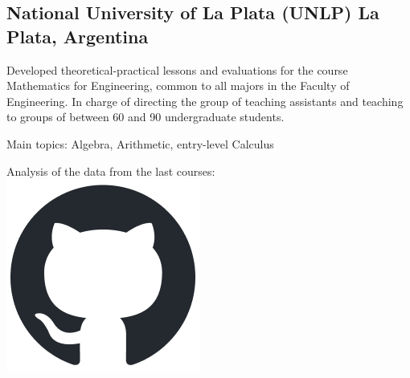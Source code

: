 
\subsection{{National University of La Plata (UNLP) \hfill  La Plata, Argentina}}
\begin{zitemize}
\item Developed theoretical-practical lessons and evaluations for the course Mathematics for Engineering, common to all majors in the Faculty of Engineering. In charge of directing the group of teaching assistants and teaching to groups of between 60 and 90 undergraduate students.
\item Main topics: Algebra, Arithmetic, entry-level Calculus
\item Analysis of the data from the last courses: \href{https://github.com/juanjogervasio/Intro-courses-analysis}{\includegraphics[scale=0.2]{github-mark.png}}

\end{zitemize}
